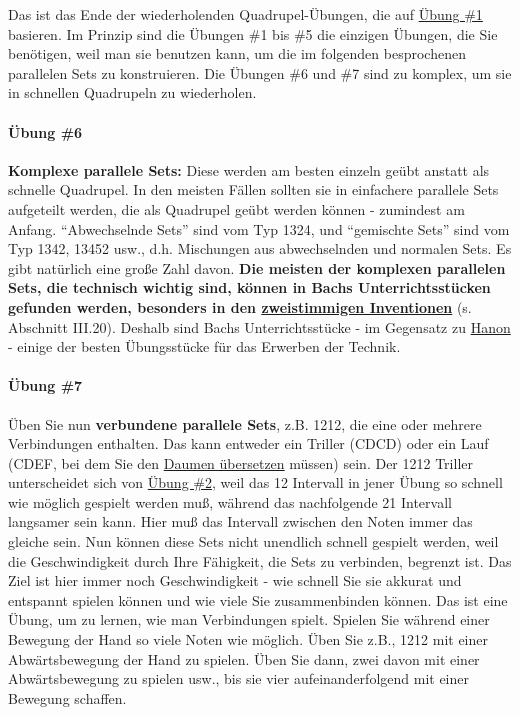 Das ist das Ende der wiederholenden Quadrupel-Übungen, die auf \hyperref[c1iii7b1]{Übung \#1} basieren.
Im Prinzip sind die Übungen \#1 bis \#5 die einzigen Übungen, die Sie benötigen, weil man sie benutzen kann, um die im folgenden besprochenen parallelen Sets zu konstruieren.
Die Übungen \#6 und \#7 sind zu komplex, um sie in schnellen Quadrupeln zu wiederholen.


\paragraph{Übung \#6}
\label{c1iii7b6}

\textbf{Komplexe parallele Sets:} Diese werden am besten einzeln geübt anstatt als schnelle Quadrupel.
In den meisten Fällen sollten sie in einfachere parallele Sets aufgeteilt werden, die als Quadrupel geübt werden können - zumindest am Anfang.
\enquote{Abwechselnde Sets} sind vom Typ 1324, und \enquote{gemischte Sets} sind vom Typ 1342, 13452 usw., d.h. Mischungen aus abwechselnden und normalen Sets.
Es gibt natürlich eine große Zahl davon.
\textbf{Die meisten der komplexen parallelen Sets, die technisch wichtig sind, können in Bachs Unterrichtsstücken gefunden werden, besonders in den \hyperref[c1iii20]{zweistimmigen Inventionen}} (s. Abschnitt III.20).
Deshalb sind Bachs Unterrichtsstücke - im Gegensatz zu \hyperref[c1iii7h]{Hanon} - einige der besten Übungsstücke für das Erwerben der Technik.


\paragraph{Übung \#7}
\label{c1iii7b7}

Üben Sie nun \textbf{verbundene parallele Sets}, z.B. 1212, die eine oder mehrere Verbindungen enthalten.
Das kann entweder ein Triller (CDCD) oder ein Lauf (CDEF, bei dem Sie den \hyperref[c1iii5a]{Daumen übersetzen} müssen) sein.
Der 1212 Triller unterscheidet sich von \hyperref[c1iii7b2]{Übung \#2}, weil das 12 Intervall in jener Übung so schnell wie möglich gespielt werden muß, während das nachfolgende 21 Intervall langsamer sein kann.
Hier muß das Intervall zwischen den Noten immer das gleiche sein.
Nun können diese Sets nicht unendlich schnell gespielt werden, weil die Geschwindigkeit durch Ihre Fähigkeit, die Sets zu verbinden, begrenzt ist.
Das Ziel ist hier immer noch Geschwindigkeit - wie schnell Sie sie akkurat und entspannt spielen können und wie viele Sie zusammenbinden können.
Das ist eine Übung, um zu lernen, wie man Verbindungen spielt.
Spielen Sie während einer Bewegung der Hand so viele Noten wie möglich.
Üben Sie z.B., 1212 mit einer Abwärtsbewegung der Hand zu spielen.
Üben Sie dann, zwei davon mit einer Abwärtsbewegung zu spielen usw., bis sie vier aufeinanderfolgend mit einer Bewegung schaffen.

